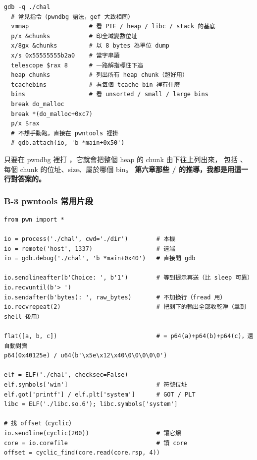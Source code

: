 \begin{lstlisting}[style=sh]
gdb -q ./chal
  # 常見指令（pwndbg 語法，gef 大致相同）
  vmmap                 # 看 PIE / heap / libc / stack 的基底
  p/x &chunks           # 印全域變數位址
  x/8gx &chunks         # 以 8 bytes 為單位 dump
  x/s 0x55555555b2a0    # 當字串讀
  telescope $rax 8      # 一路解指標往下追
  heap chunks           # 列出所有 heap chunk（超好用）
  tcachebins            # 看每個 tcache bin 裡有什麼
  bins                  # 看 unsorted / small / large bins
  break do_malloc
  break *(do_malloc+0xc7)
  p/x $rax
  # 不想手動跑，直接在 pwntools 裡掛
  # gdb.attach(io, 'b *main+0x50')
\end{lstlisting}

\begin{keybox}
只要在 pwndbg 裡打 ，它就會把整個 heap 的 chunk 由下往上列出來，
包括 、每個 chunk 的位址、size、屬於哪個 bin。
\textbf{第六章那些 / 的推導，我都是用這一行對答案的。}
\end{keybox}

\subsubsection*{B-3 pwntools 常用片段}

\begin{lstlisting}[style=py]
from pwn import *

io = process('./chal', cwd='./dir')        # 本機
io = remote('host', 1337)                  # 遠端
io = gdb.debug('./chal', 'b *main+0x40')   # 直接開 gdb

io.sendlineafter(b'Choice: ', b'1')        # 等到提示再送（比 sleep 可靠）
io.recvuntil(b'> ')
io.sendafter(b'bytes): ', raw_bytes)       # 不加換行（fread 用）
io.recvrepeat(2)                           # 把剩下的輸出全部收乾淨（拿到 shell 後用）

flat([a, b, c])                            # = p64(a)+p64(b)+p64(c)，還自動對齊
p64(0x40125e) / u64(b'\x5e\x12\x40\0\0\0\0\0')

elf = ELF('./chal', checksec=False)
elf.symbols['win']                         # 符號位址
elf.got['printf'] / elf.plt['system']      # GOT / PLT
libc = ELF('./libc.so.6'); libc.symbols['system']

# 找 offset（cyclic）
io.sendline(cyclic(200))                   # 讓它爆
core = io.corefile                         # 讀 core
offset = cyclic_find(core.read(core.rsp, 4))
\end{lstlisting}

